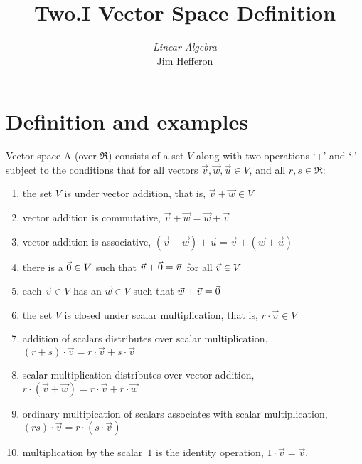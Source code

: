 \documentclass[10pt,t]{beamer}
\title[Vector Space Definition] %
{Two.I Vector Space Definition}
\author{\textit{Linear Algebra} \\ {\small Jim Hef{}feron}}
\institute{
  \texttt{http://joshua.smcvt.edu/linearalgebra}
}
\date{}
\begin{document}
\begin{frame}
  \titlepage
\end{frame}




\section{Definition and examples}





\begin{frame}{Vector space}
A 
(over \( \Re \)) consists of a set \( V \) along with
two operations `+' and `\( \cdot \)' subject to the conditions
that for all vectors \( \vec{v},\vec{w},\vec{u}\in V \), 
and all 
\( r,s\in\Re \):
\begin{enumerate}
\item the set $V$ is  under
  vector addition, that is, 
  \( \vec{v}+\vec{w}\in V \)
\pause\item vector addition is commutative,
  \( \vec{v}+\vec{w}=\vec{w}+\vec{v} \) 
\pause\item vector addition is associative,
  \( (\vec{v}+\vec{w})+\vec{u}=\vec{v}+(\vec{w}+\vec{u}) \)
\pause\item there is a 
    \( \vec{0}\in V \) such that
    \( \vec{v}+\vec{0}=\vec{v}\, \) for all \( \vec{v}\in V\/ \)
\pause\item each \( \vec{v}\in V \) has an
    \( \vec{w}\in V \) such that \( \vec{w}+\vec{v}=\vec{0} \)
\pause\item  the set $V$ is closed under
    scalar multiplication, that is, 
   \( r\cdot\vec{v}\in V \)
\pause\item addition of scalars distributes over scalar multiplication,
 \( (r+s)\cdot\vec{v}=r\cdot\vec{v}+s\cdot\vec{v} \)
\pause\item scalar multiplication distributes over vector addition,
  \( r\cdot(\vec{v}+\vec{w})=r\cdot\vec{v}+r\cdot\vec{w} \)
\pause\item ordinary multipication of scalars associates with 
  scalar multiplication, \( (rs)\cdot\vec{v} =r\cdot(s\cdot\vec{v}) \)
\pause\item multiplication by the scalar~$1$ is the 
  identity operation, \( 1\cdot\vec{v}=\vec{v} \).
\end{enumerate}
\end{frame}
\end{document}
